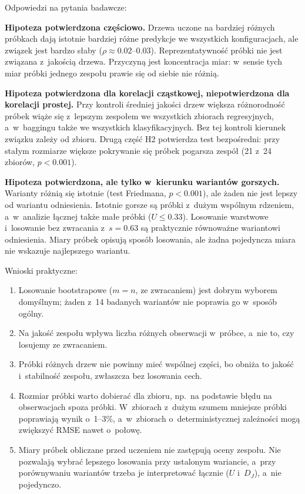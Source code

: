 Odpowiedzi na pytania badawcze:
\begin{description}[leftmargin=1.2cm,style=nextline]
  \item[PB1 / H1] \textbf{Hipoteza potwierdzona częściowo.} Drzewa uczone na bardziej różnych próbkach dają istotnie bardziej różne predykcje we wszystkich konfiguracjach, ale związek jest bardzo słaby ($\rho\approx0.02$--$0.03$). Reprezentatywność próbki nie jest związana z~jakością drzewa. Przyczyną jest koncentracja miar: w~sensie tych miar próbki jednego zespołu prawie się od siebie nie różnią.
  \item[PB2 / H2] \textbf{Hipoteza potwierdzona dla korelacji cząstkowej, niepotwierdzona dla korelacji prostej.} Przy kontroli średniej jakości drzew większa różnorodność próbek wiąże się z~lepszym zespołem we wszystkich zbiorach regresyjnych, a~w~baggingu także we wszystkich klasyfikacyjnych. Bez tej kontroli kierunek związku zależy od zbioru. Drugą część H2 potwierdza test bezpośredni: przy stałym rozmiarze większe pokrywanie się próbek pogarsza zespół (21 z~24 zbiorów, $p<0.001$).
  \item[PB3 / H3] \textbf{Hipoteza potwierdzona, ale tylko w~kierunku wariantów gorszych.} Warianty różnią się istotnie (test Friedmana, $p<0.001$), ale żaden nie jest lepszy od wariantu odniesienia. Istotnie gorsze są próbki z~dużym wspólnym rdzeniem, a~w~analizie łącznej także małe próbki ($U\le0.33$). Losowanie warstwowe i~losowanie bez zwracania z~$s=0.63$ są praktycznie równoważne wariantowi odniesienia. Miary próbek opisują sposób losowania, ale żadna pojedyncza miara nie wskazuje najlepszego wariantu.
\end{description}

Wnioski praktyczne:
\begin{enumerate}
  \item Losowanie bootstrapowe ($m=n$, ze zwracaniem) jest dobrym wyborem domyślnym; żaden z~14 badanych wariantów nie poprawia go w~sposób ogólny.
  \item Na jakość zespołu wpływa liczba różnych obserwacji w~próbce, a~nie to, czy losujemy ze zwracaniem.
  \item Próbki różnych drzew nie powinny mieć wspólnej części, bo obniża to jakość i~stabilność zespołu, zwłaszcza bez losowania cech.
  \item Rozmiar próbki warto dobierać dla zbioru, np.\ na podstawie błędu na obserwacjach spoza próbki. W~zbiorach z~dużym szumem mniejsze próbki poprawiają wynik o~1--3\%, a~w~zbiorach o~deterministycznej zależności mogą zwiększyć RMSE nawet o~połowę.
  \item Miary próbek obliczane przed uczeniem nie zastępują oceny zespołu. Nie pozwalają wybrać lepszego losowania przy ustalonym wariancie, a~przy porównywaniu wariantów trzeba je interpretować łącznie ($U$ i~$D_J$), a~nie pojedynczo.
\end{enumerate}
